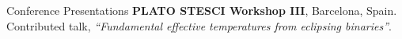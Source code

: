 \begin{rubric}{Conference Presentations}
\entry*[2019]%
	\textbf{PLATO STESCI Workshop III}, Barcelona, Spain. Contributed talk, \textit{``Fundamental effective temperatures from eclipsing binaries''}.  
%
%
\end{rubric}